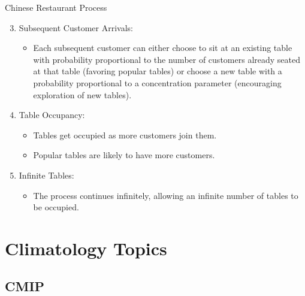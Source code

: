 \documentclass[xcolor={dvipsnames}]{beamer}
\begin{document}
\begin{frame}{Chinese Restaurant Process}

\begin{enumerate}

    \setcounter{enumi}{2}

    \item<1-> Subsequent Customer Arrivals:
    \begin{itemize}
        \item Each subsequent customer can either choose to sit at an existing table with probability proportional to the number of customers already seated at that table (favoring popular tables) or choose a new table with a probability proportional to a concentration parameter (encouraging exploration of new tables).
    \end{itemize}

    \item<2-> Table Occupancy:
    \begin{itemize}
        \item Tables get occupied as more customers join them.
        \item Popular tables are likely to have more customers.
    \end{itemize}

    \item<3> Infinite Tables:
    \begin{itemize}
        \item The process continues infinitely, allowing an infinite number of tables to be occupied.
    \end{itemize}
\end{enumerate}
    
\end{frame}

\section{Climatology Topics}

\subsection{CMIP}
\end{document}
